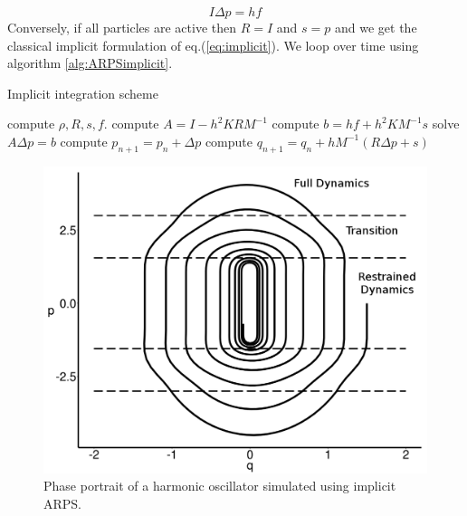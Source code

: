 \documentclass[11pt, oneside, a4paper]{memoir}
\begin{document}
\begin{equation}
    \label{eq:ARPSImplicitRestrained}
    I \Delta p = h f
\end{equation}
Conversely, if all particles are active then $R = I$ and $s = p$ and we get the classical implicit formulation of eq.(\ref{eq:implicit}).
We loop over time using algorithm \ref{alg:ARPSimplicit}.
\begin{algorithm}[H]
    \caption{Implicit integration scheme}
    \label{alg:ARPSimplicit}
    \begin{algorithmic}[10]
	    \State compute $\rho, R, s, f$.
	    \State compute $A = I - h^{2}KRM^{-1}$
	    \State compute $b = h f + h^{2}KM^{-1}s$
	    \State solve $A \Delta p = b$
            \State compute $p_{n+1} = p_{n} + \Delta p$
	    \State compute $\displaystyle q_{n+1} = q_{n} +
            hM^{-1}\left( R\Delta p+ s \right)$
	\EndFor
    \end{algorithmic}
\end{algorithm}
\begin{figure}[htb]
  \centering
  \includegraphics[width=1.0\linewidth]{images/arps-vriphys2013/implicitHOPPraw.jpeg}
  \caption{\label{fig:implicitHOPP} Phase portrait of a harmonic oscillator simulated using implicit ARPS.}
\end{figure}
\end{document}
